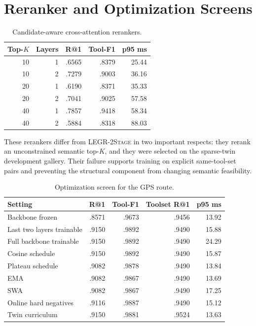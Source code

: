 \documentclass{article}
\newcommand{\method}{\textsc{LEGR-2Stage}}
\begin{document}
\section{Reranker and Optimization Screens}

\begin{table}[h]
\caption{Candidate-aware cross-attention rerankers.}
\centering
\small
\begin{tabular}{rrrrr}
\toprule
Top-$K$ & Layers & R@1 & Tool-F1 & p95 ms \\
\midrule
10 & 1 & .6565 & .8379 & 25.44 \\
10 & 2 & .7279 & .9003 & 36.16 \\
20 & 1 & .6190 & .8371 & 35.33 \\
20 & 2 & .7041 & .9025 & 57.58 \\
40 & 1 & .7857 & .9418 & 58.34 \\
40 & 2 & .5884 & .8318 & 88.03 \\
\bottomrule
\end{tabular}
\end{table}

These rerankers differ from \method{} in two important respects: they rerank an unconstrained semantic top-$K$, and they were selected on the sparse-twin development gallery.
Their failure supports training on explicit same-tool-set pairs and preventing the structural component from changing semantic feasibility.

\begin{table}[h]
\caption{Optimization screen for the GPS route.}
\centering
\small
\begin{tabular}{lrrrr}
\toprule
Setting & R@1 & Tool-F1 & Toolset R@1 & p95 ms \\
\midrule
Backbone frozen & .8571 & .9673 & .9456 & 13.92 \\
Last two layers trainable & .9150 & .9892 & .9490 & 15.88 \\
Full backbone trainable & .9150 & .9892 & .9490 & 24.29 \\
Cosine schedule & .9150 & .9892 & .9490 & 15.87 \\
Plateau schedule & .9082 & .9878 & .9490 & 13.84 \\
EMA & .9082 & .9867 & .9490 & 13.69 \\
SWA & .9082 & .9867 & .9490 & 17.25 \\
Online hard negatives & .9116 & .9887 & .9490 & 15.12 \\
Twin curriculum & .9150 & .9881 & .9524 & 13.63 \\
\bottomrule
\end{tabular}
\end{table}
\end{document}
